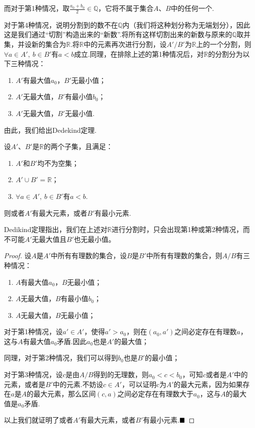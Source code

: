 而对于第1种情况，取$\frac{a_0+b_0}{2}\in \mathbb{Q}$，它将不属于集合$A$、$B$中的任何一个.\par 
对于第4种情况，说明分割到的数不在$\mathbb{Q}$内（我们将这种划分称为{\heiti 无端划分}），因此这是我们通过“切割”构造出来的“新数”.将所有这样切割出来的新数与原来的$\mathbb{Q}$取并集，并设新的集合为$\mathbb{R}$.将$\mathbb{R}$中的元素再次进行分割，设$A'/B'$为$\mathbb{R}$上的一个分割，则$\forall a \in A',\ b \in B'$有$a<b$成立.同理，在排除上述的第1种情况后，对$\mathbb{R}$的分割分为以下三种情况：
\begin{enumerate}
	\item $A'$有最大值$a_0$，$B'$无最小值；
	\item $A'$无最大值，$B'$有最小值$b_0$；
	\item $A'$无最大值，$B'$无最小值.
\end{enumerate}	

由此，我们给出Dedekind定理.
\begin{theorem}[Dedekind定理]
	设$A'$、$B'$是$\mathbb{R}$的两个子集，且满足：
	\begin{enumerate}
		\item $A'$和$B'$均不为空集；
		\item $A'\cup B'=\mathbb{R}$；
		\item $\forall a\in A',\ b\in B'$有$a<b$.
	\end{enumerate}
	则或者$A'$有最大元素，或者$B'$有最小元素.
\end{theorem}
Dedikind定理指出，我们在上述对$\mathbb{R}$进行分割时，只会出现第1种或第2种情况，而不可能$A'$无最大值且$B'$也无最小值。
\begin{proof}
	设$A$是$A'$中所有有理数的集合，设$B$是$B'$中所有有理数的集合，则$A/B$有三种情况：
	\begin{enumerate}
		\item $A$有最大值$a_0$，$B$无最小值；
		\item $A$无最大值，$B$有最小值$b_0$；
		\item $A$无最大值，$B$无最小值；
	\end{enumerate}	
	
	对于第1种情况，设$a'\in A'$，使得$a'>a_0$，则在$(a_0,a')$之间必定存在有理数$a$，这与$A$有最大值$a_0$矛盾.因此$a_0$也是$A'$的最大值；
	
	同理，对于第2种情况，我们可以得到$b_0$也是$B'$的最小值；
	
	对于第3种情况，设$c$是由$A/B$得到的无理数，则$a_0<c<b_0$，可知$c$或者是$A'$中的元素，或者是$B'$中的元素.不妨设$c\in A'$，可以证明c为$A'$的最大元素，因为如果存在$a$是$A$的最大元素，那么区间$(c,a)$之间必定存在有理数大于$a_0$，这与$A$的最大值是$a_0$矛盾.
	
	以上我们就证明了或者$A'$有最大元素，或者$B'$有最小元素.$\hfill\blacksquare$
\end{proof}
